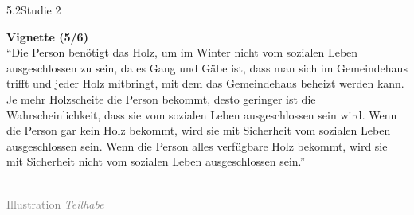 \documentclass[xcolor=table,9pt,aspectratio=169]{beamer}
\begin{document}
\begin{frame}{\vspace*{10mm}5.2\hspace*{1em}Studie 2}
\begin{multicols}{2}
   \textbf{Vignette (5/6)}\\
   \medskip
   \enquote{Die Person benötigt das Holz, um im Winter nicht vom sozialen Leben ausgeschlossen zu sein, da es Gang und Gäbe ist, dass man sich im Gemeindehaus trifft und jeder Holz mitbringt, mit dem das Gemeindehaus beheizt werden kann. Je mehr Holzscheite die Person bekommt, desto geringer ist die Wahrscheinlichkeit, dass sie vom sozialen Leben ausgeschlossen sein wird. Wenn die Person gar kein Holz bekommt, wird sie mit Sicherheit vom sozialen Leben ausgeschlossen sein. Wenn die Person alles verfügbare Holz bekommt, wird sie mit Sicherheit nicht vom sozialen Leben ausgeschlossen sein.}\\
   \vfill
   \begin{center}
      \\
      \textcolor{gray}{Illustration \textit{Teilhabe}}
   \end{center}
\end{multicols}
\end{frame}
\end{document}
